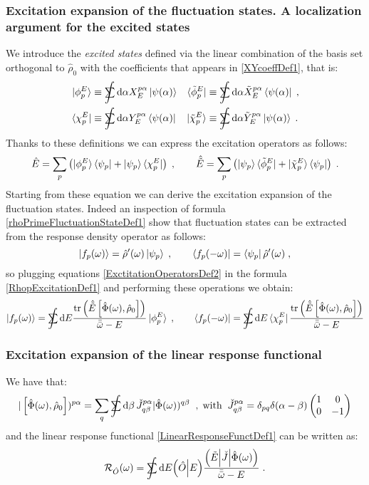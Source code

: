 \documentclass[a4paper]{article}
\newcommand{\dd}{{\rm d}}
\newcommand{\bbomega}{{\bar{\bar\omega}}}
\newcommand{\sint}{\mathrlap{\displaystyle\int}
\mathrlap{\textstyle\sum}
\phantom{\mathrlap{\displaystyle
\int}\textstyle\sum}}
\newcommand{\be}{\begin{equation}}
\newcommand{\ee}{\end{equation}}
\newcommand{\nn}{\notag}
\newcommand{\qq}{\qquad}
\newcommand{\lb}{\label}
\newcommand{\mat}[1]{\begin{pmatrix} #1\end{pmatrix}}
\newcommand{\op}[1]{\hat {#1}}
\newcommand{\commutator}[2]{\left[ {#1} , {#2} \right]}
\newcommand{\trace}[1]{\mathrm{tr}\left(#1\right)}
\newcommand{\optr}[1]{\check #1}
\newcommand{\tket}[1]{| \tilde #1 \rangle}
\newcommand{\tbra}[1]{\langle \tilde #1 |}
\newcommand{\sket}[2]{| #2)^{#1}}
\newcommand{\dket}[1]{\Bigl| #1 \Bigr)}
\newcommand{\dbra}[1]{\Bigl(#1 \Bigr|}
\newcommand{\dbraket}[2]{\Bigl(#1 \Bigl| #2 \Bigr)}
\newcommand{\dmnot}{\op{\rho}_0}
\newcommand{\dm}{\op{\rho}}
\begin{document}
\subsubsection{Excitation expansion of the fluctuation states. A localization argument for the excited states}

We introduce the \emph{excited states} defined via the linear combination of the basis set orthogonal to $\dmnot$ with the
coefficients that appears in \eqref{XYcoeffDef1}, that is:
\begin{align}\lb{ExcitonicStatesDef1}
\ket{\phi^E_p} &\equiv \sint \dd \alpha X_{E}^{p \alpha} \ket{\psi(\alpha)} &
\tbra{\phi^E_p} &\equiv \sint \dd \alpha {\tilde X_{E}^{p \alpha}} \bra{\psi(\alpha)} \;, \nn\\
\bra{\chi^E_p} &\equiv \sint \dd \alpha  Y_{E}^{p \alpha} \bra{\psi(\alpha)} &
\tket{\chi^E_p} &\equiv \sint \dd \alpha {\tilde Y}_{E}^{p\alpha} \ket{\psi(\alpha)} \;.
\end{align}
Thanks to these definitions we can express the excitation operators as follows:
\be\lb{ExctitationOperatorsDef2}
\op E = \sum_p \left( \ket{\phi^E_p}\bra{\psi_p} + \ket{\psi_p} \bra{\chi^E_p}\right)\;, \qq
\op {\tilde E} = \sum_p \left( \ket{\psi_p} \tbra{\phi^E_p} + \tket{\chi^E_p}\bra{\psi_p} \right)\;.
\ee
Starting from these equation we can derive the excitation expansion of the fluctuation states. Indeed an inspection of formula \eqref{rhoPrimeFluctuationStateDef1}
show that fluctuation states can be extracted from the response density operator as follows:
\be
\ket{f_p(\omega)} = \dm'(\omega)\ket{\psi_p} \;, \qq
\bra{f_p(-\omega)} = \bra{\psi_p}\dm'(\omega) \;, \nn
\ee
so plugging equations \eqref{ExctitationOperatorsDef2} in the formula \eqref{RhopExcitationDef1} and performing these operations we obtain:
\be\lb{FluctStateExcitationDef1}
\ket{f_p(\omega)} = \sint\dd E \frac{\trace{\op{\tilde E}\commutator{\op\Phi(\omega)}{\dmnot}}}{\bbomega-E} \ket{\phi^E_p} \;, \qq
\bra{f_p(-\omega)} = \sint\dd E \bra{\chi^E_p}\frac{\trace{\op{\tilde E}\commutator{\op\Phi(\omega)}{\dmnot}}}{\bbomega-E} 
\ee


\subsubsection{Excitation expansion of the linear response functional}

We have that:
\be
\sket{p\alpha}{\commutator{\op\Phi(\omega)}{\dmnot}} = \sum_q\sint\dd\beta\, \optr{J}^{p\alpha}_{q\beta}
\sket{q\beta}{\op\Phi(\omega)} \;\;, \;{\rm with} \;\;
\optr{J}^{p\alpha}_{q\beta} = \delta_{pq}\delta(\alpha-\beta)\mat{1 & 0 \\ 0 & -1}
\ee
and the linear response functional \eqref{LinearResponseFunctDef1} can be written as:
\be
{\cal R}_{\op O}(\omega) = 
\sint\dd E \dbraket{\op O}{E}
\frac{\dbra{\tilde E}\optr{J}\dket{\op\Phi(\omega)}}{\bbomega-E} \;.
\ee
\end{document}
